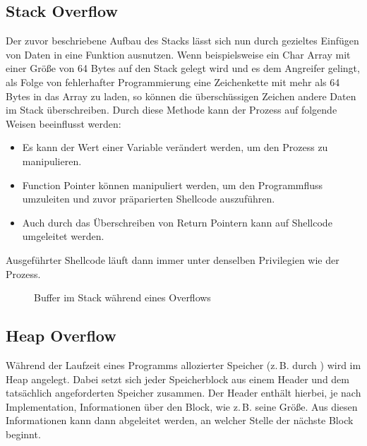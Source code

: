\subsection{Stack Overflow}
Der zuvor beschriebene Aufbau des Stacks lässt sich nun durch gezieltes Einfügen von Daten in eine Funktion ausnutzen.
Wenn beispielsweise ein Char Array mit einer Größe von 64 Bytes auf den Stack gelegt wird und es dem Angreifer gelingt,
als Folge von fehlerhafter Programmierung eine Zeichenkette mit mehr als 64 Bytes in das Array zu laden, so können
die überschüssigen Zeichen andere Daten im Stack überschreiben. Durch diese Methode kann der Prozess auf folgende
Weisen beeinflusst werden:
\begin{itemize}
    \item Es kann der Wert einer Variable verändert werden, um den Prozess zu manipulieren.
    \item Function Pointer können manipuliert werden, um den Programmfluss umzuleiten und zuvor präparierten Shellcode auszuführen.
    \item Auch durch das Überschreiben von Return Pointern kann auf Shellcode umgeleitet werden.
\end{itemize}

Ausgeführter Shellcode läuft dann immer unter denselben Privilegien wie der Prozess.
\begin{figure}[h]%
    \centering
    \qquad
    \caption{Buffer im Stack während eines Overflows}%
    \label{fig:example}%
\end{figure}

\subsection{Heap Overflow}
Während der Laufzeit eines Programms allozierter Speicher (z.\,B. durch ) wird im Heap angelegt. Dabei setzt sich 
jeder Speicherblock aus einem Header und dem tatsächlich angeforderten Speicher zusammen. Der Header enthält hierbei, 
je nach Implementation, Informationen über den Block, wie z.\,B. seine Größe. Aus diesen Informationen kann dann abgeleitet 
werden, an welcher Stelle der nächste Block beginnt.

